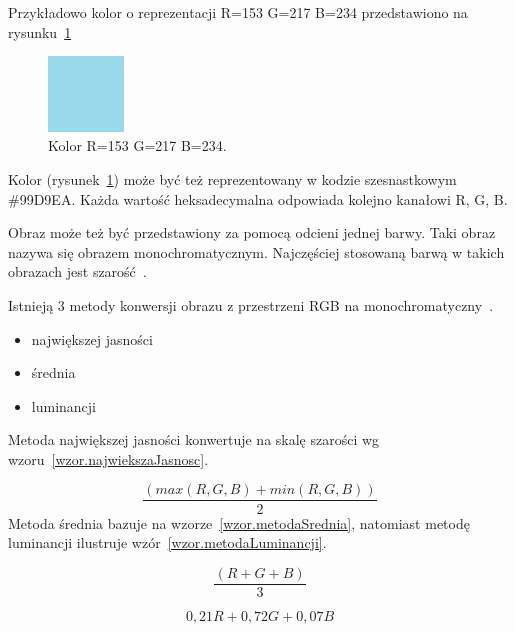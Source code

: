 \documentclass[a4paper,twoside,12pt]{book}
\begin{document}
    Przykładowo kolor o reprezentacji R=153 G=217 B=234 przedstawiono na rysunku~\ref{fig.mieszanieKolorowBlekitny}

    \begin{figure}
        \centering
        \includegraphics[width=2cm]{Obrazy/blekitny.jpg}
        \caption{Kolor R=153 G=217 B=234.}
        \label{fig.mieszanieKolorowBlekitny}
    \end{figure}

    Kolor (rysunek~\ref{fig.mieszanieKolorowBlekitny}) może być też reprezentowany w kodzie szesnastkowym \#99D9EA.
    Każda
    wartość heksadecymalna odpowiada kolejno kanałowi R, G, B.

    Obraz może też być przedstawiony za pomocą odcieni jednej barwy.
    Taki obraz nazywa się obrazem monochromatycznym.
    Najczęściej stosowaną barwą w takich obrazach jest szarość~\cite{przestrzenieKolorow}.

    Istnieją 3 metody konwersji obrazu z przestrzeni RGB na monochromatyczny~\cite{colorMixing}.
    \begin{itemize}
        \item największej jasności
        \item średnia
        \item luminancji
    \end{itemize}
    Metoda największej jasności konwertuje na skalę szarości wg wzoru~\ref{wzor.najwiekszaJasnosc}.

    \large
    \begin{equation}
        \frac{(max(R, G, B) + min(R, G, B))}{2}
        \label{wzor.najwiekszaJasnosc}
    \end{equation}
    \normalsize
    Metoda średnia bazuje na wzorze~\ref{wzor.metodaSrednia}, natomiast metodę luminancji ilustruje wzór~\ref{wzor.metodaLuminancji}.

    \large
    \begin{equation}
        \frac{(R + G + B)}{3}
        \label{wzor.metodaSrednia}
    \end{equation}
    \normalsize

    \large
    \begin{equation}
        0,21 R + 0,72 G + 0,07 B
        \label{wzor.metodaLuminancji}
    \end{equation}
    \normalsize
\end{document}
